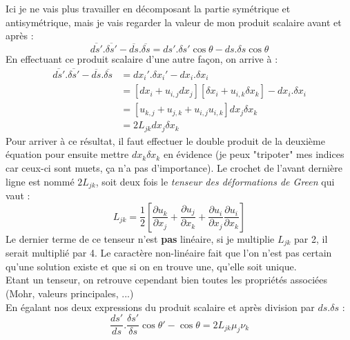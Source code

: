 Ici je ne vais plus travailler en décomposant la partie symétrique et antisymétrique, mais je 
vais regarder la valeur de mon produit scalaire avant et après :
\begin{equation}
	\overline{ds'}.\overline{\delta s'} - \overline{ds}.\overline{\delta s} = ds'.\delta s'\cos\theta
	- ds. \delta s \cos\theta
\end{equation}
En effectuant ce produit scalaire d'une autre façon, on arrive à : 
\begin{equation}
	\begin{array}{ll}
		\overline{ds'}.\overline{\delta s'} - \overline{ds}.\overline{\delta s} & =dx_i'.\delta x_i' - dx_i.                                                
		\delta x_i\\
		                                                                        & = [dx_i + u_{i,j}dx_j][\delta x_i + u_{i,k} \delta x_k] - dx_i.\delta x_i \\
		                                                                        & = [u_{k,j} + u_{j,k} + u_{i,j}u_{i,k}]dx_j\delta x_k                      \\
		                                                                        & = 2 L_{jk} dx_j \delta x_k                                                
	\end{array}
\end{equation}
Pour arriver à ce résultat, il faut effectuer le double produit de la deuxième équation pour 
ensuite mettre $dx_k\delta x_k$ en évidence (je peux "tripoter" mes indices car ceux-ci sont 
muets, ça n'a pas d'importance). Le crochet de l'avant dernière ligne est nommé $2L_{jk}$, 
soit deux fois le \textit{tenseur des déformations de Green} qui vaut :
\begin{equation}
	L_{jk} = \dfrac{1}{2}\left[\dfrac{\partial u_k}{\partial x_j}+\dfrac{\partial u_j}{\partial x_k}
	+\dfrac{\partial u_i}{\partial x_j}\dfrac{\partial u_i}{\partial x_k}\right]
\end{equation}
Le dernier terme de ce tenseur n'est \textbf{pas} linéaire, si je multiplie $L_{jk}$ par 2,
il serait multiplié par 4. Le caractère non-linéaire fait que l'on n'est pas certain qu'une
solution existe et que si on en trouve une, qu'elle soit unique.\\
Etant un tenseur, on retrouve cependant bien toutes les propriétés associées (Mohr, valeurs
principales, ...)\\
    
En égalant nos deux expressions du produit scalaire et après division par $ds.\delta s$ :
\begin{equation}
	\dfrac{ds'}{ds}.\dfrac{\delta s'}{\delta s}\cos\theta' - \cos\theta = 2L_{jk}\mu_j\nu_k
\end{equation}
    
